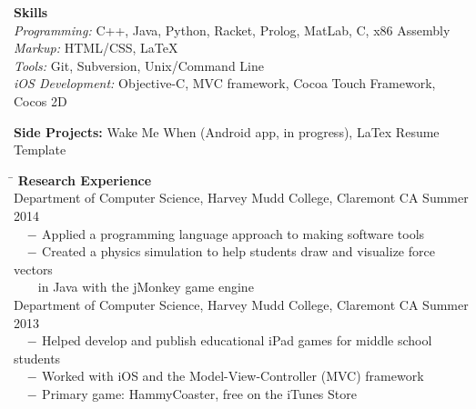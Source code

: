 \documentclass[12pt]{article}
\newcommand{\sectionNL}{\\[2pt]}
\newcommand{\customtab}{$\hspace{10pt} - \hspace{2pt}$}
\newcommand{\customtabinline}{$\hspace{23pt}$}
\begin{document}
\begin{flushleft}
{\textbf{Skills}} \sectionNL
\textit{Programming:} C++, Java, Python, Racket, Prolog, MatLab, C, x86 Assembly\\
\textit{Markup:} HTML/CSS, LaTeX \\
\textit{Tools:} Git, Subversion, Unix/Command Line \\
\textit{iOS Development:} Objective-C, MVC framework, Cocoa Touch Framework, Cocos 2D %
\end{flushleft}

\begin{flushleft}
\textbf{Side Projects:} Wake Me When (Android app, in progress), LaTex Resume Template 
\end{flushleft}


\begin{tabbing} 
\hspace*{6.5in}\= \kill
{\textbf{Research Experience} } \> \sectionNL
Department of Computer Science, Harvey Mudd College, Claremont CA \>Summer 2014 \\
\customtab Applied a programming language approach to making software tools \\
\customtab Created a physics simulation to help students draw and visualize force vectors \\
 \customtabinline in Java with the jMonkey game engine  \\

Department of Computer Science, Harvey Mudd College, Claremont CA \>Summer 2013 \\
\customtab Helped develop and publish educational iPad games for middle school students \\
\customtab Worked with iOS and the Model-View-Controller (MVC) framework \\
\customtab Primary game: HammyCoaster, free on the iTunes Store
\end{tabbing}
\end{document}
